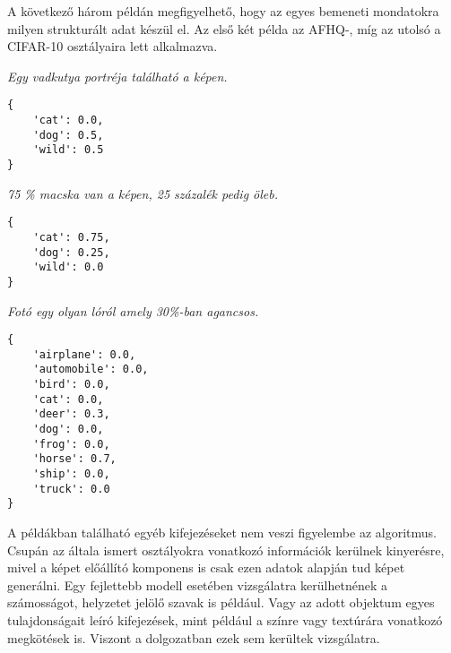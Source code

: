 A következő három példán megfigyelhető, hogy az egyes bemeneti mondatokra milyen strukturált adat készül el. Az első két példa az AFHQ-, míg az utolsó a CIFAR-10 osztályaira lett alkalmazva.

\noindent\textit{Egy vadkutya portréja található a képen.}
\small{
\begin{verbatim}
{
    'cat': 0.0,
    'dog': 0.5,
    'wild': 0.5
}
\end{verbatim}
}

\noindent\textit{75 \% macska van a képen, 25 százalék pedig öleb.}
\small{
\begin{verbatim}
{
    'cat': 0.75,
    'dog': 0.25,
    'wild': 0.0
}
\end{verbatim}
}

\noindent\textit{Fotó egy olyan lóról amely 30\%-ban agancsos.}
\small{
\begin{verbatim}
{
    'airplane': 0.0,
    'automobile': 0.0,
    'bird': 0.0,
    'cat': 0.0,
    'deer': 0.3,
    'dog': 0.0,
    'frog': 0.0,
    'horse': 0.7,
    'ship': 0.0,
    'truck': 0.0
}
\end{verbatim}
}

A példákban található egyéb kifejezéseket nem veszi figyelembe az algoritmus. Csupán az általa ismert osztályokra vonatkozó információk kerülnek kinyerésre, mivel a képet előállító komponens is csak ezen adatok alapján tud képet generálni. Egy fejlettebb modell esetében vizsgálatra kerülhetnének a számosságot, helyzetet jelölő szavak is például. Vagy az adott objektum egyes tulajdonságait leíró kifejezések, mint például a színre vagy textúrára vonatkozó megkötések is. Viszont a dolgozatban ezek sem kerültek vizsgálatra.
